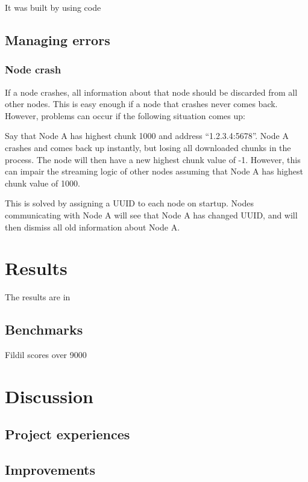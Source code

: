\documentclass[10pt, a4paper]{article}
\begin{document}
It was built by using code

\subsection{Managing errors}

\subsubsection{Node crash}
If a node crashes, all information about that node should be discarded from all
other nodes. This is easy enough if a node that crashes never comes
back. However, problems can occur if the following situation comes up:

Say that Node A has highest chunk 1000 and address ``1.2.3.4:5678''. Node A
crashes and comes back up instantly, but losing all downloaded chunks in the
process. The node will then have a new highest chunk value of -1. However, this
can impair the streaming logic of other nodes assuming that Node A has highest
chunk value of 1000.

This is solved by assigning a UUID to each node on startup. Nodes communicating
with Node A will see that Node A has changed UUID, and will then dismiss all old
information about Node A.

\section{Results}
\label{sec:results}

The results are in

\subsection{Benchmarks}

Fildil scores over 9000

\section{Discussion}
\label{sec:discussion}

\subsection{Project experiences}

\subsection{Improvements}
\end{document}
